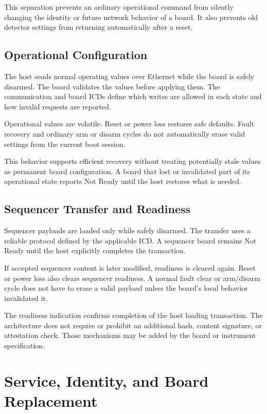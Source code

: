 This separation prevents an ordinary operational command from silently changing the identity or future network behavior of a board. It also prevents old detector settings from returning automatically after a reset.

\subsection{Operational Configuration}

The host sends normal operating values over Ethernet while the board is safely disarmed. The board validates the values before applying them. The communication and board ICDs define which writes are allowed in each state and how invalid requests are reported.

Operational values are volatile. Reset or power loss restores safe defaults. Fault recovery and ordinary arm or disarm cycles do not automatically erase valid settings from the current boot session.

This behavior supports efficient recovery without treating potentially stale values as permanent board configuration. A board that lost or invalidated part of its operational state reports Not Ready until the host restores what is needed.

\subsection{Sequencer Transfer and Readiness}

Sequencer payloads are loaded only while safely disarmed. The transfer uses a reliable protocol defined by the applicable ICD. A sequencer board remains Not Ready until the host explicitly completes the transaction.

If accepted sequencer content is later modified, readiness is cleared again. Reset or power loss also clears sequencer readiness. A normal fault clear or arm/disarm cycle does not have to erase a valid payload unless the board's local behavior invalidated it.

The readiness indication confirms completion of the host loading transaction. The architecture does not require or prohibit an additional hash, content signature, or attestation check. Those mechanisms may be added by the board or instrument specification.

\section{Service, Identity, and Board Replacement}

